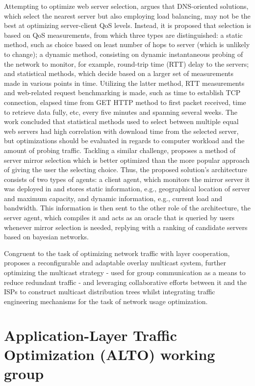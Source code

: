     Attempting to optimize web server selection, \cite{kenichi} argues that DNS-oriented solutions, which select the nearest server but also employing load balancing, may not be the best at optimizing server-client QoS levels.
    Instead, it is proposed that selection is based on QoS measurements, from which three types are distinguished: a static method, such as choice based on least number of hops to server (which is unlikely to change); a dynamic method, consisting on dynamic instantaneous probing of the network to monitor, for example, round-trip time (RTT) delay to the servers; and statistical methods, which decide based on a larger set of measurements made in various points in time.
    Utilizing the latter method, RTT measurements and web-related request benchmarking is made, such as time to establish TCP connection, elapsed time from GET HTTP method to first packet received, time to retrieve data fully, etc, every five minutes and spanning several weeks.
    The work concluded that statistical methods used to select between multiple equal web servers had high correlation with download time from the selected server, but optimizations should be evaluated in regards to computer workload and the amount of probing traffic.
    Tackling a similar challenge, \cite{swain} proposes a method of server mirror selection which is better optimized than the more popular approach of giving the user the selecting choice.
    Thus, the proposed solution's architecture consists of two types of agents: a client agent, which monitors the mirror server it was deployed in and stores static information, e.g., geographical location of server and maximum capacity, and dynamic information, e.g., current load and bandwidth.
    This information is then sent to the other role of the architecture, the server agent, which compiles it and acts as an oracle that is queried by users whenever mirror selection is needed, replying with a ranking of candidate servers based on bayesian networks.

    Congruent to the task of optimizing network traffic with layer cooperation, \cite{adaptable-overlay} proposes a reconfigurable and adaptable overlay multicast system, further optimizing the multicast strategy - used for group communication as a means to reduce redundant traffic - and leveraging collaborative efforts between it and the ISPs to construct multicast distribution trees whilst integrating traffic engineering mechanisms for the task of network usage optimization.

\section{Application-Layer Traffic Optimization (ALTO) working group}

